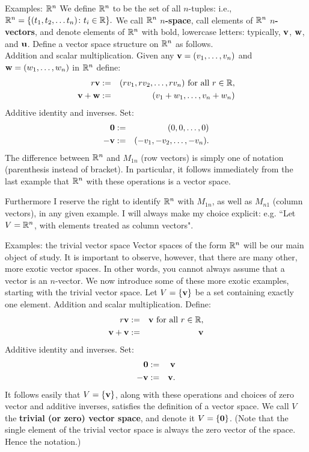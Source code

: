 \begin{frame}{Examples: \alert{${\mathbb R}^n$}}
We define ${\mathbb R}^n$ to be the set of all $n$-tuples: i.e., 
$
{\mathbb R}^n=\{(t_1,t_2,\dots t_n)\colon t_i\in{\mathbb R} \}.
$
We call ${\mathbb R}^n$ {\bf $n$-space}, call elements of ${\mathbb R}^n$ {\bf $n$-vectors}, and denote elements of ${\mathbb R}^n$ with bold, lowercase letters: typically, ${\mathbf v}$, ${\mathbf w}$, and ${\mathbf u}$. 
\bpause
Define a vector space structure on ${\mathbb R}^n$ as follows.
\\
\alert{Addition and scalar multiplication}. Given any ${\mathbf v}=(v_1,\dots,v_n)$ and ${\mathbf w}=(w_1,\dots,w_n)$ in ${\mathbb R}^n$ define:
\begin{eqnarray*}
r{\mathbf v}&:=&(rv_1,rv_2,\dots ,rv_n) \text{ for all $r\in{\mathbb R}$},\\
{\mathbf v}+{\mathbf w}&:=&(v_1+w_1,\dots,v_n+w_n)
\end{eqnarray*}
\pause 
\alert{Additive identity and inverses}. 
Set: 
\begin{eqnarray*}
{\mathbf 0}&:=&(0,0,\dots,0)\\
-{\mathbf v}&:=&(-v_1,-v_2,\dots,-v_n).
\end{eqnarray*}
\pause The difference between ${\mathbb R}^n$ and $M_{1n}$ (row vectors) is simply one of notation (parenthesis instead of bracket). In particular, it follows immediately from the last example that ${\mathbb R}^n$ with these operations is a vector space. 

\pause Furthermore I reserve the right to identify ${\mathbb R}^n$ with $M_{1n}$, as well as $M_{n1}$ (column vectors), in any given example. I will always make my choice explicit: e.g. ``Let $V={\mathbb R}^n$, with elements treated as column vectors". 


 \end{frame}
\begin{frame}{Examples: \alert{the trivial vector space}}
Vector spaces of the form ${\mathbb R}^n$ will be our main object of study. It is important to observe, however, that there are many other, more exotic vector spaces. In other words, you cannot always assume that a vector is an \alert{$n$-vector}. We now introduce some of these more exotic examples, starting with the \alert{trivial vector space}. 
\bpause
Let $V=\{{\mathbf v}\}$ be a set containing exactly one element. 
\bpause
\alert{Addition and scalar multiplication}.
Define:
\begin{eqnarray*}
r{\mathbf v}&:=&{\mathbf v} \text{ for all $r\in{\mathbb R}$},\\
{\mathbf v}+{\mathbf v}&:=&{\mathbf v}
\end{eqnarray*}
\pause 
\alert{Additive identity and inverses}.
Set: 
\begin{eqnarray*}
{\mathbf 0}&:=&{\mathbf v}\\
-{\mathbf v}&:=&{\mathbf v}.
\end{eqnarray*}
\pause It follows easily that $V=\{{\mathbf v}\}$, along with these operations and choices of zero vector and additive inverses, satisfies the definition of a vector space. 
\bpause 
We call $V$ the {\bf trivial (or zero) vector space}, and denote it $V=\{{\mathbf 0}\}$. (Note that the single element of the trivial vector space is always the zero vector of the space. Hence the notation.) 
\end{frame}

